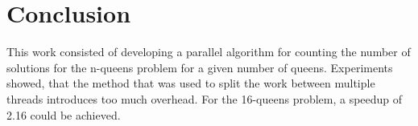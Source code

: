 \section{Conclusion}

This work consisted of developing a parallel algorithm for counting the number of solutions for the n-queens problem for a given number of queens.
Experiments showed, that the method that was used to split the work between multiple threads introduces too much overhead.
For the 16-queens problem, a speedup of 2.16 could be achieved.
